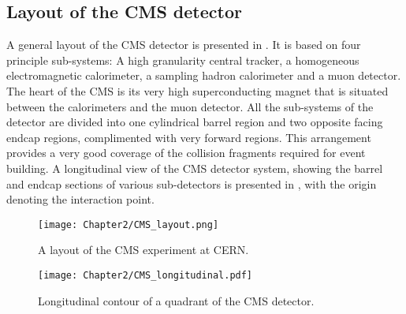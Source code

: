 \subsection{Layout of the CMS detector}
A general layout of the CMS detector is presented in \fig{\ref{fig:CMS_layout}}. It is based on four principle sub-systems: A high granularity central tracker,
a homogeneous electromagnetic calorimeter, a sampling hadron calorimeter and a muon detector. The heart of the CMS is its very high superconducting magnet
that is situated between the calorimeters and the muon detector. All the sub-systems of the detector are divided into one cylindrical barrel region and
two opposite facing endcap regions, complimented with very forward regions.
This arrangement provides a very good coverage of the collision fragments required for event building. A longitudinal view of the CMS detector system,
showing the barrel and endcap sections of various sub-detectors is presented in \fig{\ref{fig:CMS_longitudinal}}, with the origin denoting the interaction point.
\vspace{0.2in}

\begin{figure}[t]
\begin{center}
\texttt{[image: Chapter2/CMS\_layout.png]}
\caption{A layout of the CMS experiment at CERN.}
\label{fig:CMS_layout}
\end{center}
\end{figure}


\begin{figure}[h]
\begin{center}
\texttt{[image: Chapter2/CMS\_longitudinal.pdf]}
\caption{Longitudinal contour of a quadrant of the CMS detector.}
\label{fig:CMS_longitudinal}
\end{center}
\end{figure}
\vspace{-0.2in}


